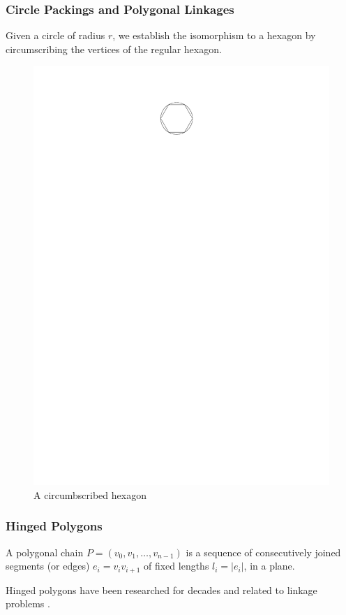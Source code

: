 \subsubsection{Circle Packings and Polygonal Linkages}
Given a circle of radius $r$, we establish the isomorphism to a hexagon by
circumscribing the vertices of the regular hexagon.
\begin{figure}[h]
\begin{center}
\includegraphics{graphics/circumscribedHexagon.pdf}
\caption{A circumbscribed hexagon}
\end{center}
\end{figure}
\subsubsection{Hinged Polygons}
\begin{definition}\label{def}
A polygonal chain $P = \left( v_0, v_1, \dots, v_{n-1}\right) $ is a sequence of
consecutively joined segments (or edges) $e_i = v_i v_{i+1}$ of fixed lengths
$l_i = \left\vert e_i\right\vert $, in a plane. \cite{Biedl99lockedand}
\end{definition}
Hinged polygons have been researched for decades and related to linkage problems
\cite{Biedl99lockedand,canny1988complexity}.

